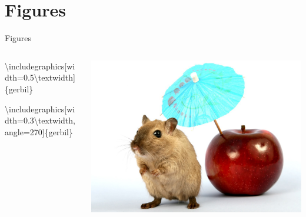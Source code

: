 \documentclass[,aspectratio=43]{beamer}
\newcommand{\VERB}{\Verb[commandchars=\\\{\}]}
\newenvironment{Shaded}{\begin{snugshade}}{\end{snugshade}}
\newcommand{\BuiltInTok}[1]{#1}
\newcommand{\ExtensionTok}[1]{#1}
\newcommand{\FunctionTok}[1]{\textcolor[rgb]{0.02,0.16,0.49}{#1}}
\newcommand{\NormalTok}[1]{#1}
\begin{document}
\hypertarget{figures}{%
\section{Figures}\label{figures}}

\begin{frame}[fragile]{Figures}

\begin{columns}[T]
\begin{column}{0.68\textwidth}
\small
\vspace{-1em}

\begin{Shaded}
\begin{Highlighting}[]
\BuiltInTok{\textbackslash{}includegraphics}\NormalTok{[width=0.5}\FunctionTok{\textbackslash{}textwidth}\NormalTok{]\{}\ExtensionTok{gerbil}\NormalTok{\}}





\BuiltInTok{\textbackslash{}includegraphics}\NormalTok{[width=0.3}\FunctionTok{\textbackslash{}textwidth}\NormalTok{,}
\NormalTok{                 angle=270]\{}\ExtensionTok{gerbil}\NormalTok{\}}
                 
                 
\end{Highlighting}
\end{Shaded}
\end{column}

\begin{column}{0.28\textwidth}
\includegraphics[width=\textwidth]{figure/gerbil}


\end{column}
\end{columns}
\end{frame}
\end{document}
